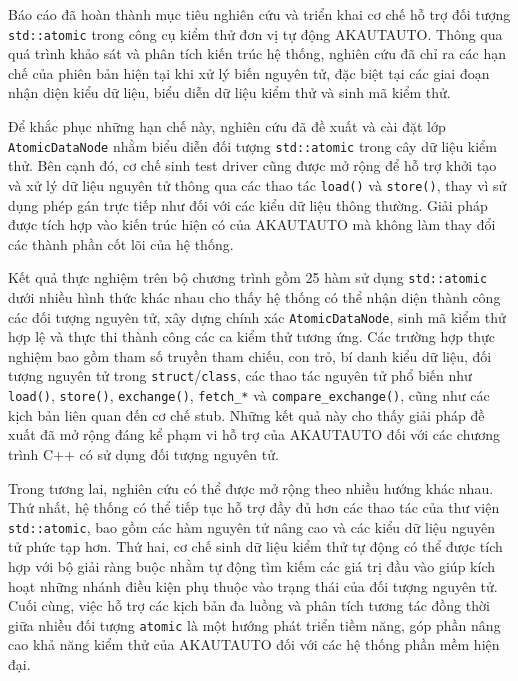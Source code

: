 Báo cáo đã hoàn thành mục tiêu nghiên cứu và triển khai cơ chế hỗ trợ đối tượng \texttt{std::atomic} trong công cụ kiểm thử đơn vị tự động AKAUTAUTO. Thông qua quá trình khảo sát và phân tích kiến trúc hệ thống, nghiên cứu đã chỉ ra các hạn chế của phiên bản hiện tại khi xử lý biến nguyên tử, đặc biệt tại các giai đoạn nhận diện kiểu dữ liệu, biểu diễn dữ liệu kiểm thử và sinh mã kiểm thử.

Để khắc phục những hạn chế này, nghiên cứu đã đề xuất và cài đặt lớp \texttt{AtomicDataNode} nhằm biểu diễn đối tượng \texttt{std::atomic} trong cây dữ liệu kiểm thử. Bên cạnh đó, cơ chế sinh test driver cũng được mở rộng để hỗ trợ khởi tạo và xử lý dữ liệu nguyên tử thông qua các thao tác \texttt{load()} và \texttt{store()}, thay vì sử dụng phép gán trực tiếp như đối với các kiểu dữ liệu thông thường. Giải pháp được tích hợp vào kiến trúc hiện có của AKAUTAUTO mà không làm thay đổi các thành phần cốt lõi của hệ thống.

Kết quả thực nghiệm trên bộ chương trình gồm 25 hàm sử dụng \texttt{std::atomic} dưới nhiều hình thức khác nhau cho thấy hệ thống có thể nhận diện thành công các đối tượng nguyên tử, xây dựng chính xác \texttt{AtomicDataNode}, sinh mã kiểm thử hợp lệ và thực thi thành công các ca kiểm thử tương ứng. Các trường hợp thực nghiệm bao gồm tham số truyền tham chiếu, con trỏ, bí danh kiểu dữ liệu, đối tượng nguyên tử trong \texttt{struct}/\texttt{class}, các thao tác nguyên tử phổ biến như \texttt{load()}, \texttt{store()}, \texttt{exchange()}, \texttt{fetch\_*} và \texttt{compare\_exchange()}, cũng như các kịch bản liên quan đến cơ chế stub. Những kết quả này cho thấy giải pháp đề xuất đã mở rộng đáng kể phạm vi hỗ trợ của AKAUTAUTO đối với các chương trình C++ có sử dụng đối tượng nguyên tử.

Trong tương lai, nghiên cứu có thể được mở rộng theo nhiều hướng khác nhau. Thứ nhất, hệ thống có thể tiếp tục hỗ trợ đầy đủ hơn các thao tác của thư viện \texttt{std::atomic}, bao gồm các hàm nguyên tử nâng cao và các kiểu dữ liệu nguyên tử phức tạp hơn. Thứ hai, cơ chế sinh dữ liệu kiểm thử tự động có thể được tích hợp với bộ giải ràng buộc nhằm tự động tìm kiếm các giá trị đầu vào giúp kích hoạt những nhánh điều kiện phụ thuộc vào trạng thái của đối tượng nguyên tử. Cuối cùng, việc hỗ trợ các kịch bản đa luồng và phân tích tương tác đồng thời giữa nhiều đối tượng \texttt{atomic} là một hướng phát triển tiềm năng, góp phần nâng cao khả năng kiểm thử của AKAUTAUTO đối với các hệ thống phần mềm hiện đại.

